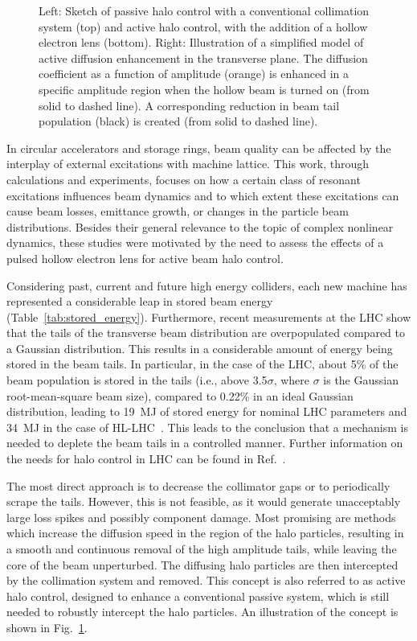 \documentclass[
prstab
,reprint
,linenumbers
,longbibliography
,preprintnumbers
,showkeys
,amsfonts,amssymb,amsmath
,floatfix
]{revtex4-1}
\begin{document}
\begin{figure}
\begin{minipage}[c]{0.4\textwidth}
  \end{minipage}
  \hspace*{\fill}
  \caption{Left: Sketch of passive halo control with a conventional
    collimation system (top) and active halo control, with the
    addition of a hollow electron lens (bottom). Right: Illustration
    of a simplified model of active diffusion enhancement in the
    transverse plane. The diffusion coefficient as a function of
    amplitude (orange) is enhanced in a specific amplitude region when
    the hollow beam is turned on (from solid to dashed line). A
    corresponding reduction in beam tail population (black) is created
    (from solid to dashed line).}
  \label{fig:active_halo_control} 
\end{figure}

In circular accelerators and storage rings, beam quality can be
affected by the interplay of external excitations with machine
lattice. This work, through calculations and experiments, focuses on
how a certain class of resonant excitations influences beam dynamics
and to which extent these excitations can cause beam losses, emittance
growth, or changes in the particle beam distributions. Besides their
general relevance to the topic of complex nonlinear dynamics, these
studies were motivated by the need to assess the effects of a pulsed
hollow electron lens for active beam halo control.

Considering past, current and future high energy colliders, each new
machine has represented a considerable leap in stored beam energy
(Table~\ref{tab:stored_energy}). Furthermore, recent measurements at
the LHC show that the tails of the transverse beam distribution are
overpopulated compared to a Gaussian distribution. This results in a
considerable amount of energy being stored in the beam tails. In
particular, in the case of the LHC, about 5\% of the beam population
is stored in the tails (i.e., above 3.5$\sigma$, where $\sigma$ is the
Gaussian root-mean-square beam size), compared to 0.22\% in an ideal
Gaussian distribution, leading to 19~MJ of stored energy for nominal
LHC parameters and 34~MJ in the case of
HL-LHC~\cite{helreview_valentino}. This leads to the conclusion that a
mechanism is needed to deplete the beam tails in a controlled
manner. Further information on the needs for halo control in LHC can
be found in Ref.~\cite{helreview}.

The most direct approach is to decrease the collimator gaps or to
periodically scrape the tails. However, this is not feasible, as it
would generate unacceptably large loss spikes and possibly component
damage. Most promising are methods which increase the diffusion speed
in the region of the halo particles, resulting in a smooth and
continuous removal of the high amplitude tails, while leaving the core
of the beam unperturbed. The diffusing halo particles are then
intercepted by the collimation system and removed. This concept is
also referred to as active halo control, designed to enhance a
conventional passive system, which is still needed to robustly
intercept the halo particles. An illustration of the concept is shown
in Fig.~\ref{fig:active_halo_control}.
\end{document}
